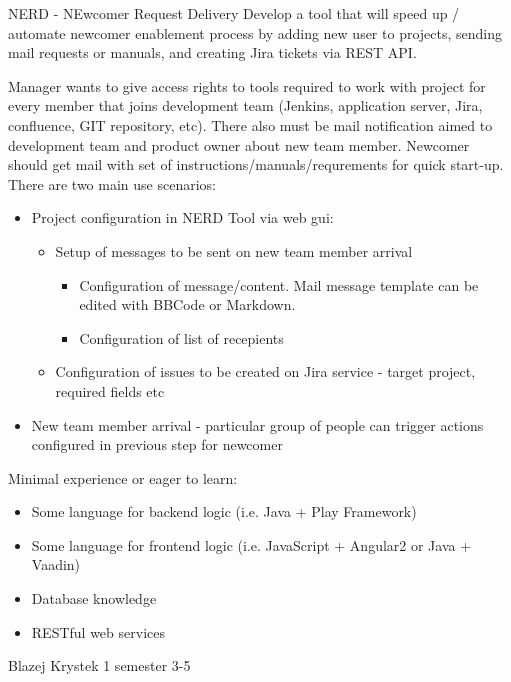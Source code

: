 \begin{project}
{NERD - NEwcomer Request Delivery}
{Develop a tool that will speed up / automate newcomer enablement process by adding new user to projects, sending mail requests or manuals, and creating Jira tickets via REST API.} 
{
Manager wants to give access rights to tools required to work with project for every member that joins development team (Jenkins, application server, Jira, confluence, GIT repository, etc). There also must be mail notification aimed to development team and product owner about new team member. Newcomer should get mail with set of instructions/manuals/requrements for quick start-up.
\bigbreak
There are two main use scenarios:
\begin{itemize}
	\item Project configuration in NERD Tool via web gui:
		\begin{itemize}
			\item Setup of messages to be sent on new team member arrival
				\begin{itemize}
					\item Configuration of message/content. Mail message template can be edited with BBCode or Markdown.
					\item Configuration of list of recepients 
				\end{itemize}
			\item Configuration of issues to be created on Jira service - target project, required fields etc
		\end{itemize}
	\item New team member arrival - particular group of people can trigger actions configured in previous step for newcomer
\end{itemize}
}
{
Minimal experience or eager to learn:
\begin{itemize}
	\item Some language for backend logic (i.e. Java + Play Framework)
	\item Some language for frontend logic (i.e. JavaScript + Angular2 or Java + Vaadin)
	\item Database knowledge
	\item RESTful web services
\end{itemize}
}
{Blazej Krystek}
{1 semester}
{3-5}
\end{project}
